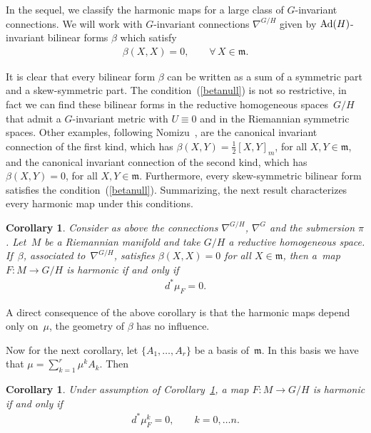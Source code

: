 \documentclass[pdftex]{sigma}
\numberwithin{equation}{section}
\newtheorem{Corollary}[Theorem]{Corollary}
\newcommand{\m}{\mathfrak{m}}
\begin{document}
In the sequel, we classify the harmonic maps for a large class of $G$-invariant connections. We will work with $G$-invariant connections $\nabla^{G/H}$ given by ${\rm Ad}(H)$-invariant bilinear forms $\beta$ which satisfy
\begin{gather}\label{betanull}
  \beta(X,X) = 0,\qquad \forall\, X \in \m.
\end{gather}

It is clear that every bilinear form $\beta$ can be written as a sum
of a symmetric part and a skew-symmetric part. The condition~(\ref{betanull}) is not so restrictive, in fact we can f\/ind these
bilinear forms in the   reductive homogeneous spaces~$G/H$ that
admit a $G$-invariant metric with $U \equiv 0$ and in the Riemannian
symmetric spaces. Other examples, following Nomizu~\cite{Nomizu},
are the canonical invariant connection of the f\/irst kind,  which has
$\beta(X,Y)= \frac{1}{2}[X,Y]_{m}$, for all $X,Y \in \m$, and the
canonical invariant connection of the second kind, which has
$\beta(X,Y) = 0$, for all $X,Y \in \m$. Furthermore, every
skew-symmetric bilinear form satisf\/ies the condition~(\ref{betanull}). Summarizing,
 the next result characterizes every harmonic map under this conditions.

\begin{Corollary}\label{corollarybetanull}
  Consider as above the connections $\nabla^{G/H}$, $\nabla^{G}$ and the submersion $\pi$. Let~$M$ be a Riemannian manifold and take $G/H$ a reductive homogeneous space. If~$\beta$, associated to~$\nabla^{G/H}$, satisfies $\beta(X,X)= 0$ for all $X \in \m$, then a~map   $F\colon M \rightarrow G/H$ is harmonic if and only if
  \begin{gather*}
    d^{*}\mu_{F} = 0.
  \end{gather*}
\end{Corollary}

A direct consequence of the above corollary is that the harmonic maps depend only on~$\mu$, the geometry of $\beta$ has no inf\/luence.

Now for the next corollary, let $\{A_1, \ldots, A_r\}$ be a basis of~$\m$. In this basis we have that $\mu = \sum\limits_{k=1}^{r}\mu^{k} A_k$.
Then

\begin{Corollary}
  Under assumption of Corollary~{\rm \ref{corollarybetanull}}, a map $F\colon M \rightarrow G/H$ is harmonic if and only if
  \begin{gather*}
    d^{*}\mu_{F}^k = 0,\qquad k=0,\ldots n.
  \end{gather*}
\end{Corollary}
\end{document}
